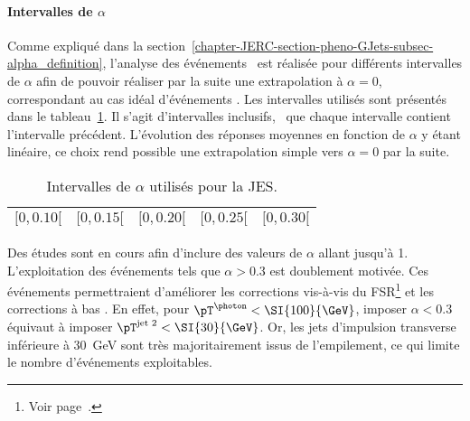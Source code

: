 \paragraph{Intervalles de $\alpha$}
Comme expliqué dans la section~\ref{chapter-JERC-section-pheno-GJets-subsec-alpha_definition}, l'analyse des événements \Gjets\ est réalisée pour différents intervalles de $\alpha$ afin de pouvoir réaliser par la suite une extrapolation à $\alpha=0$, correspondant au cas idéal d'événements \Gjet.
Les intervalles utilisés sont présentés dans le tableau~\ref{tab-alpha_intervalles}.
Il s'agit d'intervalles inclusifs, \ie\ que chaque intervalle contient l'intervalle précédent.
L'évolution des réponses moyennes en fonction de $\alpha$ y étant linéaire, ce choix rend possible une extrapolation simple vers $\alpha=0$ par la suite.
\begin{table}[h]
\centering
\begin{tabular}{ccccc}
\toprule
$[\num{0}, \num{0.10}[$ & $[\num{0}, \num{0.15}[$ & $[\num{0}, \num{0.20}[$ & $[\num{0}, \num{0.25}[$ & $[\num{0}, \num{0.30}[$ \\
\bottomrule
\end{tabular}
\caption{Intervalles de $\alpha$ utilisés pour la JES.}
\label{tab-alpha_intervalles}
\end{table}
\par Des études sont en cours afin d'inclure des valeurs de $\alpha$ allant jusqu'à \num{1}.
L'exploitation des événements tels que $\alpha>\num{0.3}$ est doublement motivée.
Ces événements permettraient d'améliorer les corrections vis-à-vis du FSR\footnote{Voir page~\pageref{subfig-fgraph-gq_qGamma_S-FSR_2jets}.} et les corrections à bas \pT.
En effet, pour $\pT^{\photon}<\SI{100}{\GeV}$, imposer $\alpha<\num{0.3}$ équivaut à imposer $\pT^\text{jet 2}<\SI{30}{\GeV}$.
Or, les jets d'impulsion transverse inférieure à \SI{30}{\GeV} sont très majoritairement issus de l'empilement, ce qui limite le nombre d'événements exploitables.
